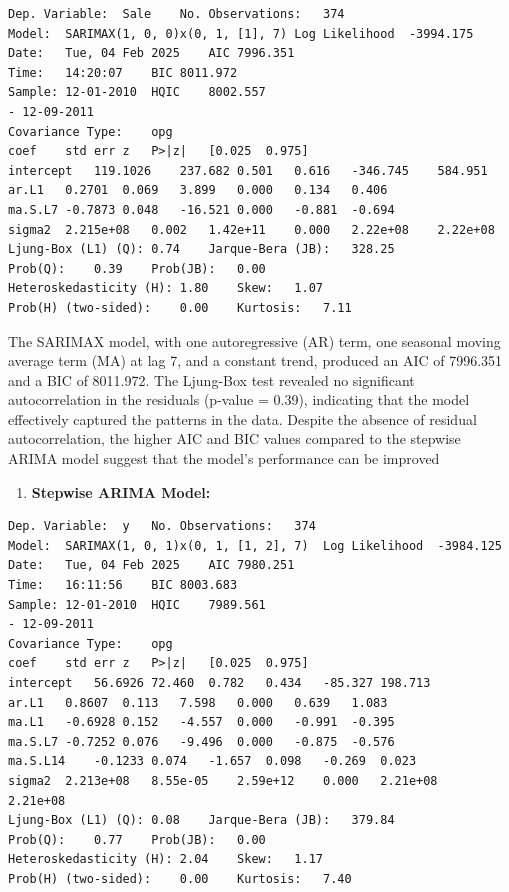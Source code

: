 \documentclass[
  a4paper,
  DIV=11,
  numbers=noendperiod]{scrartcl}
\providecommand{\tightlist}{%
  \setlength{\itemsep}{0pt}\setlength{\parskip}{0pt}}\usepackage{longtable,booktabs,array}
\begin{document}
\begin{verbatim}
Dep. Variable:  Sale    No. Observations:   374
Model:  SARIMAX(1, 0, 0)x(0, 1, [1], 7) Log Likelihood  -3994.175
Date:   Tue, 04 Feb 2025    AIC 7996.351
Time:   14:20:07    BIC 8011.972
Sample: 12-01-2010  HQIC    8002.557
- 12-09-2011        
Covariance Type:    opg     
coef    std err z   P>|z|   [0.025  0.975]
intercept   119.1026    237.682 0.501   0.616   -346.745    584.951
ar.L1   0.2701  0.069   3.899   0.000   0.134   0.406
ma.S.L7 -0.7873 0.048   -16.521 0.000   -0.881  -0.694
sigma2  2.215e+08   0.002   1.42e+11    0.000   2.22e+08    2.22e+08
Ljung-Box (L1) (Q): 0.74    Jarque-Bera (JB):   328.25
Prob(Q):    0.39    Prob(JB):   0.00
Heteroskedasticity (H): 1.80    Skew:   1.07
Prob(H) (two-sided):    0.00    Kurtosis:   7.11
\end{verbatim}

The SARIMAX model, with one autoregressive (AR) term, one seasonal
moving average term (MA) at lag 7, and a constant trend, produced an AIC
of 7996.351 and a BIC of 8011.972. The Ljung-Box test revealed no
significant autocorrelation in the residuals (p-value = 0.39),
indicating that the model effectively captured the patterns in the data.
Despite the absence of residual autocorrelation, the higher AIC and BIC
values compared to the stepwise ARIMA model suggest that the model's
performance can be improved

\begin{enumerate}
\def\labelenumi{\arabic{enumi}.}
\setcounter{enumi}{1}
\tightlist
\item
  \textbf{Stepwise ARIMA Model:}
\end{enumerate}

\begin{verbatim}
Dep. Variable:  y   No. Observations:   374
Model:  SARIMAX(1, 0, 1)x(0, 1, [1, 2], 7)  Log Likelihood  -3984.125
Date:   Tue, 04 Feb 2025    AIC 7980.251
Time:   16:11:56    BIC 8003.683
Sample: 12-01-2010  HQIC    7989.561
- 12-09-2011        
Covariance Type:    opg     
coef    std err z   P>|z|   [0.025  0.975]
intercept   56.6926 72.460  0.782   0.434   -85.327 198.713
ar.L1   0.8607  0.113   7.598   0.000   0.639   1.083
ma.L1   -0.6928 0.152   -4.557  0.000   -0.991  -0.395
ma.S.L7 -0.7252 0.076   -9.496  0.000   -0.875  -0.576
ma.S.L14    -0.1233 0.074   -1.657  0.098   -0.269  0.023
sigma2  2.213e+08   8.55e-05    2.59e+12    0.000   2.21e+08    2.21e+08
Ljung-Box (L1) (Q): 0.08    Jarque-Bera (JB):   379.84
Prob(Q):    0.77    Prob(JB):   0.00
Heteroskedasticity (H): 2.04    Skew:   1.17
Prob(H) (two-sided):    0.00    Kurtosis:   7.40
\end{verbatim}
\end{document}
